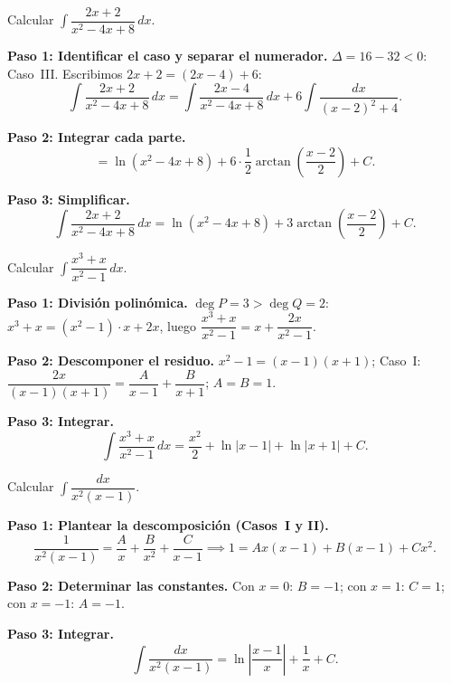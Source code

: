 \begin{example}
Calcular $\displaystyle\int\dfrac{2x+2}{x^2-4x+8}\,dx$.

\begin{myproof}

\textbf{Paso 1: Identificar el caso y separar el numerador.}
$\Delta = 16-32<0$: Caso~III. Escribimos $2x+2=(2x-4)+6$:
\[
\int\frac{2x+2}{x^2-4x+8}\,dx
=\int\frac{2x-4}{x^2-4x+8}\,dx+6\int\frac{dx}{(x-2)^2+4}.
\]

\textbf{Paso 2: Integrar cada parte.}
\[
=\ln(x^2-4x+8)+6\cdot\frac{1}{2}\arctan\!\left(\frac{x-2}{2}\right)+C.
\]

\textbf{Paso 3: Simplificar.}
\[
\boxed{\int\frac{2x+2}{x^2-4x+8}\,dx
=\ln(x^2-4x+8)+3\arctan\!\left(\frac{x-2}{2}\right)+C.}
\]
\end{myproof}
\end{example}

\begin{example}
Calcular $\displaystyle\int\dfrac{x^3+x}{x^2-1}\,dx$.

\begin{myproof}

\textbf{Paso 1: División polinómica.}
$\deg P=3>\deg Q=2$: $x^3+x=(x^2-1)\cdot x+2x$, luego $\dfrac{x^3+x}{x^2-1}=x+\dfrac{2x}{x^2-1}$.

\textbf{Paso 2: Descomponer el residuo.}
$x^2-1=(x-1)(x+1)$; Caso~I: $\dfrac{2x}{(x-1)(x+1)}=\dfrac{A}{x-1}+\dfrac{B}{x+1}$; $A=B=1$.

\textbf{Paso 3: Integrar.}
\[
\boxed{\int\frac{x^3+x}{x^2-1}\,dx
=\frac{x^2}{2}+\ln|x-1|+\ln|x+1|+C.}
\]
\end{myproof}
\end{example}

\begin{example}
Calcular $\displaystyle\int\dfrac{dx}{x^2(x-1)}$.

\begin{myproof}

\textbf{Paso 1: Plantear la descomposición (Casos~I y II).}
\[
\frac{1}{x^2(x-1)}=\frac{A}{x}+\frac{B}{x^2}+\frac{C}{x-1}
\implies 1=Ax(x-1)+B(x-1)+Cx^2.
\]

\textbf{Paso 2: Determinar las constantes.}
Con $x=0$: $B=-1$; con $x=1$: $C=1$; con $x=-1$: $A=-1$.

\textbf{Paso 3: Integrar.}
\[
\boxed{\int\frac{dx}{x^2(x-1)}
=\ln\left|\frac{x-1}{x}\right|+\frac{1}{x}+C.}
\]
\end{myproof}
\end{example}

